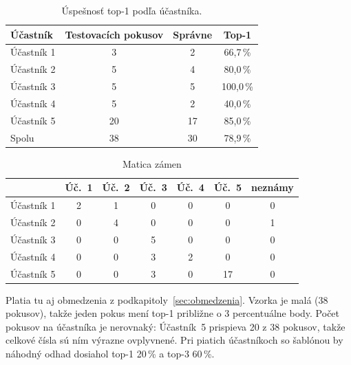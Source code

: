 \begin{table}[!htbp]
  \centering
  \small
  \caption{Úspešnosť top-1 podľa účastníka.}
  \label{tab:participant}
  \begin{tabularx}{\textwidth}{|Y|C|C|C|}
    \hline
     \textbf{Účastník} & \textbf{Testovacích pokusov} & \textbf{Správne} & \textbf{Top-1} \\
    \hline
    Účastník 1 & 3 & 2 & 66,7\,\% \\
    \hline
    Účastník 2 & 5 & 4 & 80,0\,\% \\
    \hline
    Účastník 3 & 5 & 5 & 100,0\,\% \\
    \hline
    Účastník 4 & 5 & 2 & 40,0\,\% \\
    \hline
    Účastník 5 & 20 & 17 & 85,0\,\% \\
    \hline
    Spolu & 38 & 30 & 78,9\,\% \\
    \hline
  \end{tabularx}
\end{table}

\begin{table}[!htbp]
  \centering
  \small
  \caption{Matica zámen}
  \label{tab:confusion}
  \begin{tabularx}{\textwidth}{|Y|C|C|C|C|C|C|}
    \hline
      & \textbf{Úč.~1} & \textbf{Úč.~2} & \textbf{Úč.~3} & \textbf{Úč.~4} & \textbf{Úč.~5} & \textbf{neznámy} \\
    \hline
    Účastník 1 & 2 & 1 & 0 & 0 & 0 & 0 \\
    \hline
    Účastník 2 & 0 & 4 & 0 & 0 & 0 & 1 \\
    \hline
    Účastník 3 & 0 & 0 & 5 & 0 & 0 & 0 \\
    \hline
    Účastník 4 & 0 & 0 & 3 & 2 & 0 & 0 \\
    \hline
    Účastník 5 & 0 & 0 & 3 & 0 & 17 & 0 \\
    \hline
  \end{tabularx}
\end{table}

Platia tu aj obmedzenia z podkapitoly~\ref{sec:obmedzenia}. Vzorka je malá (38 pokusov), takže jeden
pokus mení top-1 približne o 3 percentuálne body. Počet pokusov na účastníka
je nerovnaký: Účastník~5 prispieva 20 z 38 pokusov, takže celkové čísla sú
ním výrazne ovplyvnené. Pri piatich účastníkoch so šablónou by náhodný
odhad dosiahol top-1 20\,\% a top-3 60\,\%.

